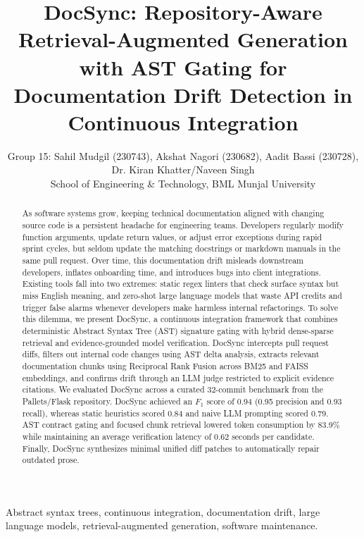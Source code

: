 \documentclass[12pt,onecolumn,draftclsnofoot]{IEEEtran}
\begin{document}
\title{DocSync: Repository-Aware Retrieval-Augmented Generation with AST Gating for Documentation Drift Detection in Continuous Integration}

\author{Group 15: Sahil Mudgil (230743), Akshat Nagori (230682), Aadit Bassi (230728), Dr. Kiran Khatter/Naveen Singh\\
School of Engineering \& Technology, BML Munjal University}

\maketitle

\begin{abstract}
As software systems grow, keeping technical documentation aligned with changing source code is a persistent headache for engineering teams. Developers regularly modify function arguments, update return values, or adjust error exceptions during rapid sprint cycles, but seldom update the matching docstrings or markdown manuals in the same pull request. Over time, this documentation drift misleads downstream developers, inflates onboarding time, and introduces bugs into client integrations. Existing tools fall into two extremes: static regex linters that check surface syntax but miss English meaning, and zero-shot large language models that waste API credits and trigger false alarms whenever developers make harmless internal refactorings. To solve this dilemma, we present DocSync, a continuous integration framework that combines deterministic Abstract Syntax Tree (AST) signature gating with hybrid dense-sparse retrieval and evidence-grounded model verification. DocSync intercepts pull request diffs, filters out internal code changes using AST delta analysis, extracts relevant documentation chunks using Reciprocal Rank Fusion across BM25 and FAISS embeddings, and confirms drift through an LLM judge restricted to explicit evidence citations. We evaluated DocSync across a curated 32-commit benchmark from the Pallets/Flask repository. DocSync achieved an $F_1$ score of 0.94 (0.95 precision and 0.93 recall), whereas static heuristics scored 0.84 and naive LLM prompting scored 0.79. AST contract gating and focused chunk retrieval lowered token consumption by 83.9\% while maintaining an average verification latency of 0.62 seconds per candidate. Finally, DocSync synthesizes minimal unified diff patches to automatically repair outdated prose.
\end{abstract}

\begin{IEEEkeywords}
Abstract syntax trees, continuous integration, documentation drift, large language models, retrieval-augmented generation, software maintenance.
\end{IEEEkeywords}
\end{document}
